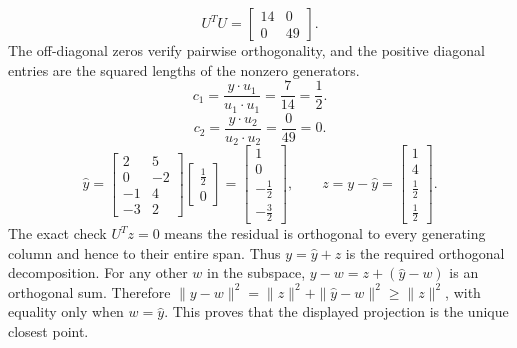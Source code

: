 \[U^TU=\left[\begin{array}{rr}14&0\\0&49\end{array}\right].\]
The off-diagonal zeros verify pairwise orthogonality, and the positive diagonal entries are the squared lengths of the nonzero generators.
\[c_{1}=\frac{y\cdot u_{1}}{u_{1}\cdot u_{1}}=\frac{7}{14}=\frac{1}{2}.\]
\[c_{2}=\frac{y\cdot u_{2}}{u_{2}\cdot u_{2}}=\frac{0}{49}=0.\]
\[\widehat y=\left[\begin{array}{rr}2&5\\0&-2\\-1&4\\-3&2\end{array}\right]\left[\begin{array}{r}\frac{1}{2}\\0\end{array}\right]=\left[\begin{array}{r}1\\0\\- \frac{1}{2}\\- \frac{3}{2}\end{array}\right],\qquad z=y-\widehat y=\left[\begin{array}{r}1\\4\\\frac{1}{2}\\\frac{1}{2}\end{array}\right].\]
The exact check $U^Tz=0$ means the residual is orthogonal to every generating column and hence to their entire span. Thus $y=\widehat y+z$ is the required orthogonal decomposition.
For any other $w$ in the subspace, $y-w=z+(\widehat y-w)$ is an orthogonal sum. Therefore $\|y-w\|^2=\|z\|^2+\|\widehat y-w\|^2\ge\|z\|^2$, with equality only when $w=\widehat y$. This proves that the displayed projection is the unique closest point.


